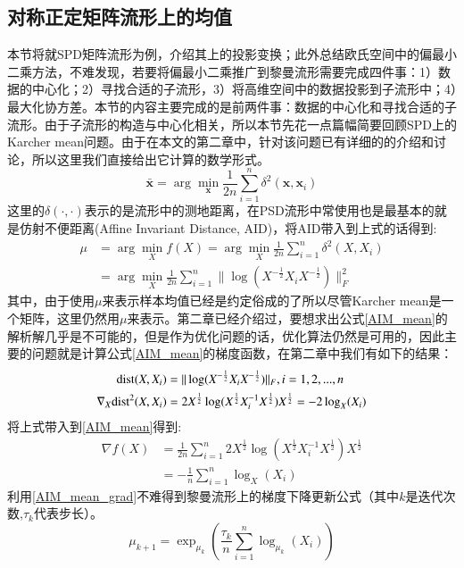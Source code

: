 \subsection{对称正定矩阵流形上的均值}
\label{sec:riemannian_mean}
本节将就SPD矩阵流形为例，介绍其上的投影变换；此外总结欧氏空间中的偏最小二乘方法，不难发现，若要将偏最小二乘推广到黎曼流形需要完成四件事：1）数据的中心化；2）寻找合适的子流形，3）将高维空间中的数据投影到子流形中；4）最大化协方差。本节的内容主要完成的是前两件事：数据的中心化和寻找合适的子流形。由于子流形的构造与中心化相关，所以本节先花一点篇幅简要回顾SPD上的Karcher mean问题。由于在本文的第二章中，针对该问题已有详细的的介绍和讨论，所以这里我们直接给出它计算的数学形式。
\begin{displaymath}
\bar{\bm{x}}=\arg\min_{\bm{x}}\frac{1}{2n}\sum_{i=1}^{n}\delta^{2}(\bm{x},\bm{x}_i)
\end{displaymath}
这里的$\delta(\cdot,\cdot)$表示的是流形中的测地距离，在PSD流形中常使用也是最基本的就是仿射不便距离(Affine Invariant Distance, AID\cite{AIM_metric})，将AID带入到上式的话得到:
\begin{equation}
\label{AIM_mean}
\begin{split}
\mu&=\arg\min_{X}f(X)=\arg\min_{X}\frac{1}{2n}\sum_{i=1}^{n}\delta^{2}(X,X_i)\\
&=\arg\min_{X}\frac{1}{2n}\sum_{i=1}^{n}\|\log(X^{-\frac{1}{2}}X_iX^{-\frac{1}{2}})\|_{F}^{2}
\end{split}
\end{equation}
其中，由于使用$\mu$来表示样本均值已经是约定俗成的了所以尽管Karcher mean是一个矩阵，这里仍然用$\mu$来表示。第二章已经介绍过，要想求出公式\ref{AIM_mean}的解析解几乎是不可能的，但是作为优化问题的话，优化算法仍然是可用的，因此主要的问题就是计算公式\ref{AIM_mean}的梯度函数，在第二章中我们有如下的结果：
\begin{equation}
\label{AIM_grad}
\begin{split}
{\rm dist}(X,X_i)&=\|\log(X^{-\frac{1}{2}} X_i X^{-\frac{1}{2}})\|_{F},i=1,2,...,n\\
\nabla_X {\rm dist^{2}}(X,X_i)&=2X^{\frac{1}{2}}\log(X^{\frac{1}{2}}X_{i}^{-1}X^{\frac{1}{2}})X^{\frac{1}{2}}=-2\log_{X}(X_i)
\end{split}
\end{equation}
将上式带入到\ref{AIM_mean}得到:
\begin{equation}
\label{AIM_mean_grad}
\begin{split}
\nabla f(X)&=\frac{1}{2n}\sum_{i=1}^{n}2X^{\frac{1}{2}}\log(X^{\frac{1}{2}}X_{i}^{-1}X^{\frac{1}{2}})X^{\frac{1}{2}}\\
&=-\frac{1}{n}\sum_{i=1}^{n}\log_{X}(X_i)
\end{split}
\end{equation}
利用\ref{AIM_mean_grad}不难得到黎曼流形上的梯度下降更新公式（其中$k$是迭代次数,$\tau_k$代表步长）。
\begin{equation}
\label{AIM_grad_update}
\mu_{k+1}=\exp_{\mu_k}(\frac{\tau_k}{n}\sum_{i=1}^{n}\log_{\mu_k}(X_i))
\end{equation}
